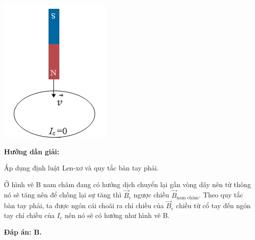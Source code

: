 {{\begin{mcq}
	\item  \includegraphics[scale=0.8]{../figs/VN11-PH-29-L-020-2-h66.jpg}
	
\end{mcq}}
{
\begin{center}
	\textbf{Hướng dẫn giải:}
\end{center}

Áp dụng định luật Len-xơ và quy tắc bàn tay phải.

Ở hình vẽ B nam châm đang có hướng dịch chuyển lại gần vòng dây nên từ thông nó sẽ tăng nên để chống lại sự tăng thì $\vec{B}_\text{c}$ ngược chiều $\vec{B}_\text{nam châm}$. Theo quy tắc bàn tay phải,  ta được ngón cái choãi ra chỉ chiều của $\vec{B}_\text{c}$ chiều từ cổ tay đến ngón tay chỉ chiều của $I_\text{c}$ nên nó sẽ có hướng như hình vẽ B.
	
\textbf{Đáp án: B.}}
}


